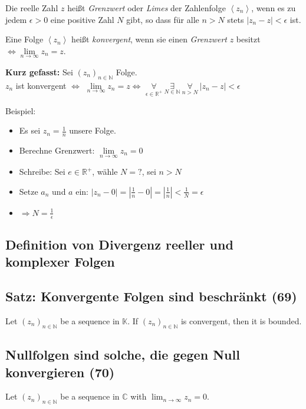Die reelle Zahl $z$ heißt \textit{Grenzwert} oder \textit{Limes} der Zahlenfolge $\left\langle z _ { n } \right\rangle$, wenn es zu jedem $\epsilon > 0$ eine positive Zahl $N$
 gibt, so dass für alle $n > N$ stets $| z _ { n } - z | < \epsilon$ ist.
 
 Eine Folge $\left\langle z _ { n } \right\rangle$ heißt \textit{konvergent}, wenn sie einen \textit{Grenzwert} $z$ besitzt $\Leftrightarrow \lim\limits_ { n \rightarrow \infty } z _ { n } = z$.
 
\textbf{Kurz gefasst:} Sei $(z_n)_{n \in \mathbb{N}}$ Folge.\\
$z_n$ ist konvergent $\Leftrightarrow$ 
$\lim\limits_{n \rightarrow \infty}{z_n} = z \Leftrightarrow$ 
$\underset{\epsilon \in \mathbb{R^+}}{\forall} \ \underset{N \in \mathbb{N}}{\exists} \ \underset{n > N}{\forall} \  |z_n - z| < \epsilon$
\newline
\begin{leftbar}
 Beispiel:
\begin{itemize}
 \item Es sei $z_n = \frac{1}{n}$ unsere Folge.
 \item Berechne Grenzwert: $\lim\limits_{n \rightarrow \infty}{z_n} = 0$
 \item Schreibe: Sei $e \in \mathbb{R^+}$, wähle $N = ?$, sei $n > N$
 \item Setze $a_n$ und $a$ ein: $|z_n - 0| = |\frac{1}{n} -0| = {|\frac{1}{n}| < \frac{1}{N}} = \epsilon$
 \item $\Rightarrow N = \frac{1}{\epsilon}$
 \end{itemize} 
 \end{leftbar}
 
 


\subsection{Definition von Divergenz reeller und komplexer Folgen}

\subsection{Satz: Konvergente Folgen sind beschränkt (69)}
Let $(z _ { n }) _ { n \in \mathbb { N } }$ be a sequence in $\mathbb{K}$. If  $(z _ { n }) _ { n \in \mathbb { N } }$  is convergent, then it is bounded.

\subsection{Nullfolgen sind solche, die gegen Null konvergieren (70)}
Let $(z _ { n }) _ { n \in \mathbb { N } }$ be a sequence in $\mathbb{C}$ with $\lim _ { n \rightarrow \infty } z _ { n } = 0$.

